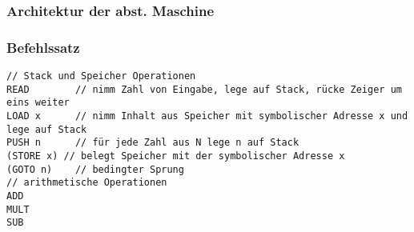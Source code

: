 \subsubsection*{Architektur der abst. Maschine}

\subsubsection*{Befehlssatz}
\begin{lstlisting}
// Stack und Speicher Operationen
READ 		// nimm Zahl von Eingabe, lege auf Stack, rücke Zeiger um eins weiter
LOAD x		// nimm Inhalt aus Speicher mit symbolischer Adresse x und lege auf Stack
PUSH n		// für jede Zahl aus N lege n auf Stack
(STORE x) // belegt Speicher mit der symbolischer Adresse x 
(GOTO n) 	// bedingter Sprung
// arithmetische Operationen
ADD
MULT
SUB
\end{lstlisting}





